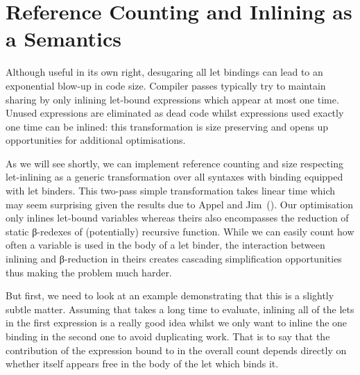 \section{Reference Counting and Inlining as a Semantics}\label{section:inlining}

Although useful in its own right, desugaring all let bindings can lead
to an exponential blow-up in code size. Compiler passes typically try
to maintain sharing by only inlining let-bound expressions which appear
at most one time. Unused expressions are eliminated as dead code whilst
expressions used exactly one time can be inlined: this transformation is
size preserving and opens up opportunities for additional optimisations.

As we will see shortly, we can implement reference counting and size
respecting let-inlining as a generic transformation over all syntaxes
with binding equipped with let binders. This two-pass simple transformation
takes linear time which may seem surprising given the results due to Appel and
Jim~(\citeyear{DBLP:journals/jfp/AppelJ97}). Our optimisation only inlines
let-bound variables whereas theirs also encompasses the reduction of static
β-redexes of (potentially) recursive function. While we can easily count how
often a variable is used in the body of a let binder, the interaction between
inlining and β-reduction in theirs creates cascading simplification opportunities
thus making the problem much harder.

But first, we need to look at an example demonstrating that this is a
slightly subtle matter. Assuming that  takes a long time
to evaluate, inlining all of the lets in the first expression is a really
good idea whilst we only want to inline the one binding  in the
second one to avoid duplicating work. That is to say that the contribution
of the expression bound to  in the overall count depends directly
on whether  itself appears free in the body of the let which binds it.

\begin{figure}[h]
\begin{minipage}{0.45\textwidth}
\end{minipage}
\begin{minipage}{0.45\textwidth}
\end{minipage}
\end{figure}


